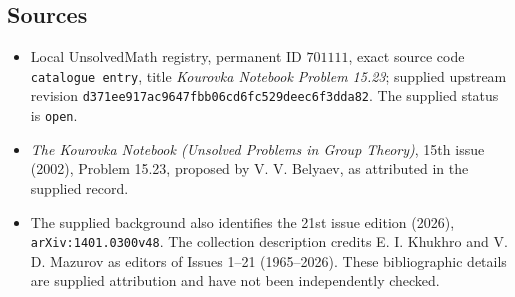 \documentclass[11pt]{article}
\begin{document}
\subsection{Sources}
\begin{itemize}
\item Local UnsolvedMath registry, permanent ID \(701111\), exact source code \texttt{catalogue entry}, title \emph{Kourovka Notebook Problem 15.23}; supplied upstream revision \texttt{d371ee917ac9647fbb06cd6fc529deec6f3dda82}. The supplied status is \texttt{open}.
\item \emph{The Kourovka Notebook (Unsolved Problems in Group Theory)}, 15th issue (2002), Problem 15.23, proposed by V. V. Belyaev, as attributed in the supplied record.
\item The supplied background also identifies the 21st issue edition (2026), \texttt{arXiv:1401.0300v48}. The collection description credits E. I. Khukhro and V. D. Mazurov as editors of Issues 1--21 (1965--2026). These bibliographic details are supplied attribution and have not been independently checked.
\end{itemize}
\end{document}
